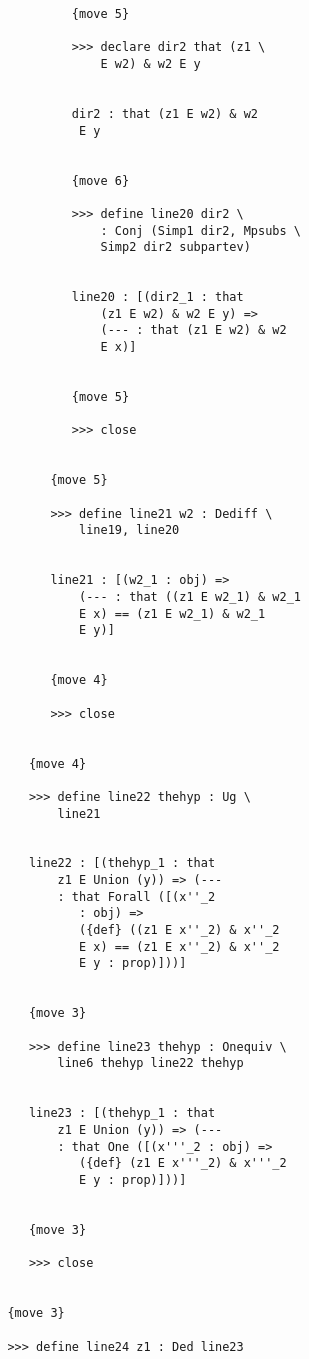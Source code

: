 \documentclass[12pt]{article}
\begin{document}
\begin{verbatim}
                  {move 5}

                  >>> declare dir2 that (z1 \
                      E w2) & w2 E y


                  dir2 : that (z1 E w2) & w2 
                   E y


                  {move 6}

                  >>> define line20 dir2 \
                      : Conj (Simp1 dir2, Mpsubs \
                      Simp2 dir2 subpartev)


                  line20 : [(dir2_1 : that 
                      (z1 E w2) & w2 E y) => 
                      (--- : that (z1 E w2) & w2 
                      E x)]


                  {move 5}

                  >>> close


               {move 5}

               >>> define line21 w2 : Dediff \
                   line19, line20


               line21 : [(w2_1 : obj) => 
                   (--- : that ((z1 E w2_1) & w2_1 
                   E x) == (z1 E w2_1) & w2_1 
                   E y)]


               {move 4}

               >>> close


            {move 4}

            >>> define line22 thehyp : Ug \
                line21


            line22 : [(thehyp_1 : that 
                z1 E Union (y)) => (--- 
                : that Forall ([(x''_2 
                   : obj) => 
                   ({def} ((z1 E x''_2) & x''_2 
                   E x) == (z1 E x''_2) & x''_2 
                   E y : prop)]))]


            {move 3}

            >>> define line23 thehyp : Onequiv \
                line6 thehyp line22 thehyp


            line23 : [(thehyp_1 : that 
                z1 E Union (y)) => (--- 
                : that One ([(x'''_2 : obj) => 
                   ({def} (z1 E x'''_2) & x'''_2 
                   E y : prop)]))]


            {move 3}

            >>> close


         {move 3}

         >>> define line24 z1 : Ded line23



\end{verbatim}
\end{document}

